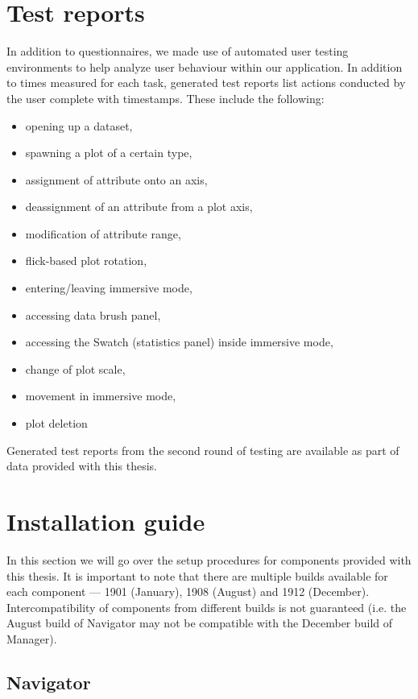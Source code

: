 \documentclass[thesis=M,english,hidelinks]{FITthesisXE}[2012/06/26]
\begin{document}
\chapter{Test reports}

In addition to questionnaires, we made use of automated user testing environments to help analyze user behaviour within our application. In addition to times measured for each task, generated test reports list actions conducted by the user complete with timestamps. These include the following:

\begin{itemize}
\item opening up a dataset,
\item spawning a plot of a certain type,
\item assignment of attribute onto an axis,
\item deassignment of an attribute from a plot axis,
\item modification of attribute range,
\item flick-based plot rotation,
\item entering/leaving immersive mode,
\item accessing data brush panel,
\item accessing the Swatch (statistics panel) inside immersive mode,
\item change of plot scale,
\item movement in immersive mode,
\item plot deletion
\end{itemize}

Generated test reports from the second round of testing are available as part of data provided with this thesis.

\chapter{Installation guide}

In this section we will go over the setup procedures for components provided with this thesis. It is important to note that there are multiple builds available for each component --- 1901 (January), 1908 (August) and 1912 (December). Intercompatibility of components from different builds is not guaranteed (i.e. the August build of Navigator may not be compatible with the December build of Manager).

\section{Navigator}
\end{document}
